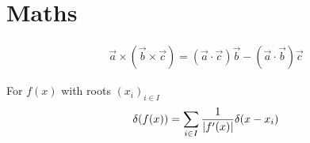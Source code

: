 \section{Maths}

\begin{align*}
  \vec{a} \times (\vec{b} \times \vec{c}) = (\vec{a} \cdot \vec{c}) \vec{b} - (\vec{a} \cdot \vec{b}) \vec{c}
\end{align*}

For $f(x)$ with roots $(x_i)_{i \in I}$
\begin{align*}
  \delta(f(x)) = \sum_{i \in I} \frac{1}{\vert f'(x)\vert}\delta(x - x_i)
\end{align*}


